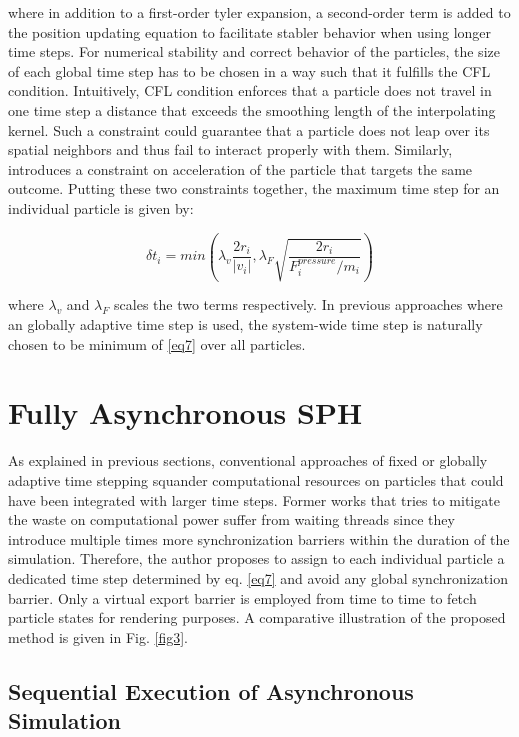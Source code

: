 \documentclass[
	11pt, 
	DIV10,
	ngerman,
	a4paper, 
	oneside, 
	headings=normal, 
	captions=tableheading,
	final, 
	numbers=noenddot
]{scrartcl}
\begin{document}
where in addition to a first-order tyler expansion, a second-order term is added to the position updating equation to facilitate stabler behavior when using longer time steps. For numerical stability and correct behavior of the particles, the size of each global time step has to be chosen in a way such that it fulfills the CFL condition. Intuitively, CFL condition enforces that a particle does not travel in one time step a distance that exceeds the smoothing length of the interpolating kernel. Such a constraint could guarantee that a particle does not leap over its spatial neighbors and thus fail to interact properly with them. Similarly, \cite{PE:vriphys:vriphys10:079-088} introduces a constraint on acceleration of the particle that targets the same outcome. Putting these two constraints together, the maximum time step for an individual particle is given by:

\begin{equation}
	\label{eq7}
	\delta t_{i} = min(\lambda_{v}\frac{2r_{i}}{|v_{i}|}, \lambda_{F}\sqrt{\frac{2r_{i}}{F_{i}^{pressure}/m_{i}}})
\end{equation}

where $ \lambda_{v} $ and $ \lambda_{F} $ scales the two terms respectively. In previous approaches where an globally adaptive time step is used, the system-wide time step is naturally chosen to be minimum of \ref{eq7} over all particles.


\section{Fully Asynchronous SPH}

As explained in previous sections, conventional approaches of fixed or globally adaptive time stepping squander computational resources on particles that could have been integrated with larger time steps. Former works that tries to mitigate the waste on computational power suffer from waiting threads since they introduce multiple times more synchronization barriers within the duration of the simulation. Therefore, the author proposes to assign to each individual particle a dedicated time step determined by eq. \ref{eq7} and avoid any global synchronization barrier. Only a virtual export barrier is employed from time to time to fetch particle states for rendering purposes. A comparative illustration of the proposed method is given in Fig. \ref{fig3}.

\subsection{Sequential Execution of Asynchronous Simulation}
\end{document}
